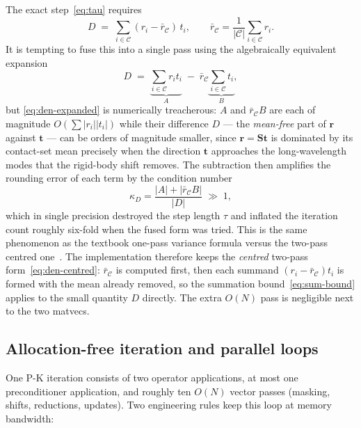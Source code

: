 \documentclass[11pt,a4paper]{article}
\newcommand{\bS}{\mathbf{S}}
\newcommand{\br}{\mathbf{r}}
\newcommand{\bt}{\mathbf{t}}
\newcommand{\calC}{\mathcal{C}}
\begin{document}
The exact step~\eqref{eq:tau} requires
\begin{equation}
  D \;=\; \sum_{i\in\calC} (r_i - \bar r_\calC)\, t_i,
  \qquad \bar r_\calC = \frac{1}{|\calC|}\sum_{i\in\calC} r_i .
  \label{eq:den-centred}
\end{equation}
It is tempting to fuse this into a single pass using the algebraically
equivalent expansion
\begin{equation}
  D \;=\; \underbrace{\sum_{i\in\calC} r_i t_i}_{A}
        \;-\; \bar r_\calC \underbrace{\sum_{i\in\calC} t_i}_{B},
  \label{eq:den-expanded}
\end{equation}
but \eqref{eq:den-expanded} is numerically treacherous: $A$ and
$\bar r_\calC B$ are each of magnitude $O(\sum |r_i||t_i|)$ while their
difference $D$ --- the \emph{mean-free} part of $\br$ against $\bt$ --- can be
orders of magnitude smaller, since $\br = \bS\bt$ is dominated by its
contact-set mean precisely when the direction $\bt$ approaches the
long-wavelength modes that the rigid-body shift removes.  The subtraction then
amplifies the rounding error of each term by the condition number
\begin{equation}
  \kappa_D = \frac{|A| + |\bar r_\calC B|}{|D|} \;\gg\; 1,
\end{equation}
which in single precision destroyed the step length $\tau$ and inflated the
iteration count roughly six-fold when the fused form was tried.  This is the
same phenomenon as the textbook one-pass variance formula versus the two-pass
centred one~\cite{ChanGolubLeVeque1983}.  The implementation therefore keeps
the \emph{centred} two-pass form~\eqref{eq:den-centred}: $\bar r_\calC$ is
computed first, then each summand $(r_i - \bar r_\calC)t_i$ is formed with the
mean already removed, so the summation bound~\eqref{eq:sum-bound} applies to
the small quantity $D$ directly.  The extra $O(N)$ pass is negligible next to
the two matvecs.

\subsection{Allocation-free iteration and parallel loops}
\label{sec:impl-alloc}

One P-K iteration consists of two operator applications, at most one
preconditioner application, and roughly ten $O(N)$ vector passes (masking,
shifts, reductions, updates).  Two engineering rules keep this loop at memory
bandwidth:
\end{document}
